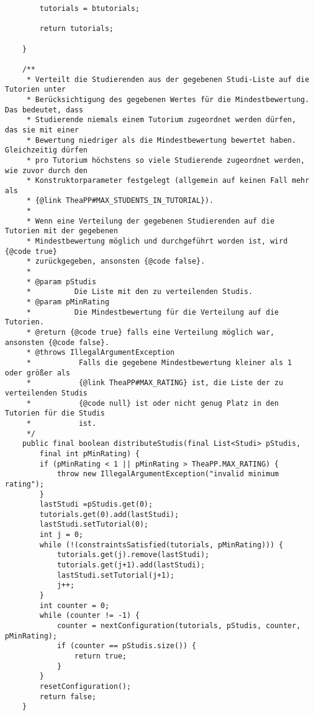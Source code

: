 \documentclass{pi2}
\begin{document}
\begin{lstlisting}
		tutorials = btutorials;
		
		return tutorials;
		
	}

	/**
	 * Verteilt die Studierenden aus der gegebenen Studi-Liste auf die Tutorien unter
	 * Berücksichtigung des gegebenen Wertes für die Mindestbewertung. Das bedeutet, dass
	 * Studierende niemals einem Tutorium zugeordnet werden dürfen, das sie mit einer
	 * Bewertung niedriger als die Mindestbewertung bewertet haben. Gleichzeitig dürfen
	 * pro Tutorium höchstens so viele Studierende zugeordnet werden, wie zuvor durch den
	 * Konstruktorparameter festgelegt (allgemein auf keinen Fall mehr als
	 * {@link TheaPP#MAX_STUDENTS_IN_TUTORIAL}).
	 *
	 * Wenn eine Verteilung der gegebenen Studierenden auf die Tutorien mit der gegebenen
	 * Mindestbewertung möglich und durchgeführt worden ist, wird {@code true}
	 * zurückgegeben, ansonsten {@code false}.
	 *
	 * @param pStudis
	 *          Die Liste mit den zu verteilenden Studis.
	 * @param pMinRating
	 *          Die Mindestbewertung für die Verteilung auf die Tutorien.
	 * @return {@code true} falls eine Verteilung möglich war, ansonsten {@code false}.
	 * @throws IllegalArgumentException
	 *           Falls die gegebene Mindestbewertung kleiner als 1 oder größer als
	 *           {@link TheaPP#MAX_RATING} ist, die Liste der zu verteilenden Studis
	 *           {@code null} ist oder nicht genug Platz in den Tutorien für die Studis
	 *           ist.
	 */
	public final boolean distributeStudis(final List<Studi> pStudis,
		final int pMinRating) {
		if (pMinRating < 1 || pMinRating > TheaPP.MAX_RATING) {
    		throw new IllegalArgumentException("invalid minimum rating");
    	}
    	lastStudi =pStudis.get(0);
    	tutorials.get(0).add(lastStudi);
    	lastStudi.setTutorial(0);
    	int j = 0;
    	while (!(constraintsSatisfied(tutorials, pMinRating))) {
    		tutorials.get(j).remove(lastStudi);
    		tutorials.get(j+1).add(lastStudi);
    		lastStudi.setTutorial(j+1);
    		j++;
    	}
    	int counter = 0;
    	while (counter != -1) {
    		counter = nextConfiguration(tutorials, pStudis, counter, pMinRating);
    		if (counter == pStudis.size()) {
    			return true;
    		}
    	}
        resetConfiguration();
        return false;
	}


\end{lstlisting}
\end{document}
